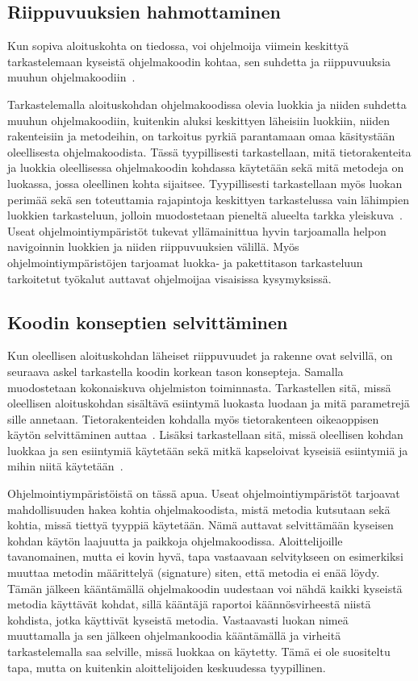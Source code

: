 \documentclass[finnish]{tktltiki2}
\theoremstyle{definition}
\theoremstyle{remark}
\begin{document}
\subsection{Riippuvuuksien hahmottaminen}
Kun sopiva aloituskohta on tiedossa, voi ohjelmoija viimein keskittyä tarkastelemaan kyseistä ohjelmakoodin kohtaa, sen suhdetta ja riippuvuuksia muuhun ohjelmakoodiin~\cite{questions-during-software-evolution-tasks}.

Tarkastelemalla aloituskohdan ohjelmakoodissa olevia luokkia ja niiden suhdetta muuhun ohjelmakoodiin, kuitenkin aluksi keskittyen läheisiin luokkiin, niiden rakenteisiin ja metodeihin, on tarkoitus pyrkiä parantamaan omaa käsitystään oleellisesta ohjelmakoodista. Tässä tyypillisesti tarkastellaan, mitä tietorakenteita ja luokkia oleellisessa ohjelmakoodin kohdassa käytetään sekä mitä metodeja on luokassa, jossa oleellinen kohta sijaitsee. Tyypillisesti tarkastellaan myös luokan perimää sekä sen toteuttamia rajapintoja keskittyen tarkastelussa vain lähimpien luokkien tarkasteluun, jolloin muodostetaan pieneltä alueelta tarkka yleiskuva~\cite{questions-during-software-evolution-tasks}.
Useat ohjelmointiympäristöt tukevat yllämainittua hyvin tarjoamalla helpon navigoinnin luokkien ja niiden riippuvuuksien välillä. Myös ohjelmointiympäristöjen tarjoamat luokka- ja pakettitason tarkasteluun tarkoitetut työkalut auttavat ohjelmoijaa visaisissa kysymyksissä.

\subsection{Koodin konseptien selvittäminen}
Kun oleellisen aloituskohdan läheiset riippuvuudet ja rakenne ovat selvillä, on seuraava askel tarkastella koodin korkean tason konsepteja. Samalla muodostetaan kokonaiskuva ohjelmiston toiminnasta. Tarkastellen sitä, missä oleellisen aloituskohdan sisältävä esiintymä luokasta luodaan ja mitä parametrejä sille annetaan. Tietorakenteiden kohdalla myös tietorakenteen oikeaoppisen käytön selvittäminen auttaa~\cite{eliciting-design-requirements-for-maintenance-oriented-ides}. Lisäksi tarkastellaan sitä, missä oleellisen kohdan luokkaa ja sen esiintymiä käytetään sekä mitkä kapseloivat kyseisiä esiintymiä ja mihin niitä käytetään~\cite{questions-during-software-evolution-tasks}.

Ohjelmointiympäristöistä on tässä apua. Useat ohjelmointiympäristöt tarjoavat mahdollisuuden hakea kohtia ohjelmakoodista, mistä metodia kutsutaan sekä kohtia, missä tiettyä tyyppiä käytetään. Nämä auttavat selvittämään kyseisen kohdan käytön laajuutta ja paikkoja ohjelmakoodissa. Aloittelijoille tavanomainen, mutta ei kovin hyvä, tapa vastaavaan selvitykseen on esimerkiksi muuttaa metodin määrittelyä (signature) siten, että metodia ei enää löydy. Tämän jälkeen kääntämällä ohjelmakoodin uudestaan voi nähdä kaikki kyseistä metodia käyttävät kohdat, sillä kääntäjä raportoi käännösvirheestä niistä kohdista, jotka käyttivät kyseistä metodia. Vastaavasti luokan nimeä muuttamalla ja sen jälkeen ohjelmankoodia kääntämällä ja virheitä tarkastelemalla saa selville, missä luokkaa on käytetty. Tämä ei ole suositeltu tapa, mutta on kuitenkin aloittelijoiden keskuudessa tyypillinen.
\end{document}
